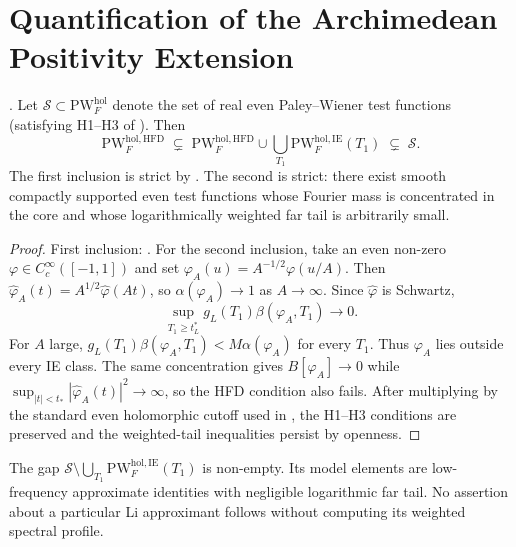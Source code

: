 \section{Quantification of the Archimedean Positivity Extension}
\label{v4-arith:w7-e:quantification}

\begin{theorem}
\label{v4-arith:w7-e:thm:extent}
\ClaimStatusProvedHere. Let \(\mathcal{S}\subset\mathrm{PW}^{\mathrm{hol}}_{F}\)
denote the set of real even Paley--Wiener test functions (satisfying
H1--H3 of ). Then
\begin{equation}
\label{v4-arith:w7-e:eq:extent-bound}
\mathrm{PW}^{\mathrm{hol},\mathrm{HFD}}_{F}\;\subsetneq\;
\mathrm{PW}^{\mathrm{hol},\mathrm{HFD}}_{F}\cup
\bigcup_{T_{1}}\mathrm{PW}^{\mathrm{hol},\mathrm{IE}}_{F}(T_{1})
\;\subsetneq\;\mathcal{S}.
\end{equation}
The first inclusion is strict by
. The second is strict:
there exist smooth compactly supported even test functions whose
Fourier mass is concentrated in the core and whose logarithmically
weighted far tail is arbitrarily small.
\end{theorem}

\begin{proof}
First inclusion: .
For the second inclusion, take an even non-zero
\(\varphi\in C^{\infty}_{c}([-1,1])\) and set
\(\varphi_{A}(u)=A^{-1/2}\varphi(u/A)\). Then
\(\widehat{\varphi}_{A}(t)=A^{1/2}\widehat{\varphi}(At)\), so
\(\alpha(\varphi_{A})\to1\) as \(A\to\infty\). Since
\(\widehat{\varphi}\) is Schwartz,
\[
\sup_{T_{1}\geq t_{L}^{\ast}}
g_{L}(T_{1})\beta(\varphi_{A},T_{1})\to0 .
\]
For \(A\) large, \(g_{L}(T_{1})\beta(\varphi_{A},T_{1})<M\alpha(\varphi_{A})\)
for every \(T_{1}\). Thus \(\varphi_{A}\) lies outside every IE class.
The same concentration gives \(B[\varphi_{A}]\to0\) while
\(\sup_{|t|<t_{\ast}}|\widehat{\varphi}_{A}(t)|^{2}\to\infty\), so the
HFD condition also fails.
After multiplying by the standard even holomorphic cutoff used in
, the H1--H3 conditions are
preserved and the weighted-tail inequalities persist by openness.
\end{proof}

\begin{remark}
\label{v4-arith:w7-e:rem:gap-captures}
The gap
\(\mathcal{S}\setminus\bigcup_{T_{1}}\mathrm{PW}^{\mathrm{hol},\mathrm{IE}}_{F}(T_{1})\)
is non-empty. Its model elements are low-frequency approximate
identities with negligible logarithmic far tail. No assertion about a
particular Li approximant follows without computing its weighted
spectral profile.
\end{remark}

